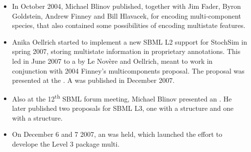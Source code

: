 \begin{itemize}
 \item In October 2004, Michael Blinov published, together with Jim Fader, Byron Goldstein, Andrew Finney and Bill Hlavacek,  for encoding multi-component species, that also contained some possibilities of encoding multistate features. 

 \item Anika Oellrich started to implement a new SBML L2 support for StochSim in spring 2007, storing multistate information in proprietary annotations. This led in June 2007 to a  by Le Nov\`ere and Oellrich, meant to work in conjunction with 2004 Finney's multicomponents proposal. The proposal was presented at the . A  was published in December 2007. 

 \item Also at the 12\textsuperscript{th} SBML forum meeting, Michael Blinov presented an . He later published two proposals for SBML L3, one with a  structure and one with a  structure. 

 \item On December 6 and 7 2007, an  was held, which launched the effort to develope the Level 3 package multi. 
\end{itemize}



